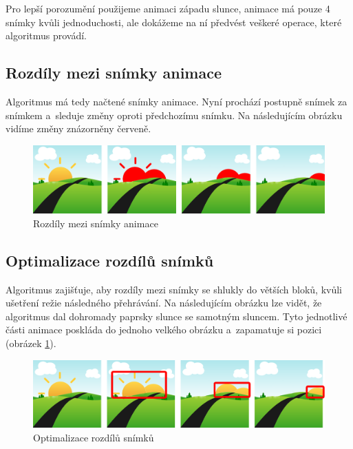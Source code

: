 Pro lepší porozumění použijeme animaci západu slunce, animace má pouze 4 snímky kvůli jednoduchosti, ale dokážeme na ní předvést veškeré operace, které algoritmus provádí.


\subsection{Rozdíly mezi snímky animace}
\label{section:algdiffsformat}

Algoritmus má tedy načtené snímky animace. Nyní prochází postupně snímek za snímkem a~sleduje změny oproti předchozímu snímku. Na následujícím obrázku vidíme změny znázorněny červeně.

\begin{figure}[h]
\centering
\includegraphics[width=1\textwidth]{figures/alg-diffs.png}
\caption{Rozdíly mezi snímky animace}
\label{fig:algdiffs}
\end{figure}


\subsection{Optimalizace rozdílů snímků}

Algoritmus zajišťuje, aby rozdíly mezi snímky se shlukly do větších bloků, kvůli ušetření režie následného přehrávání. Na následujícím obrázku lze vidět, že algoritmus dal dohromady paprsky slunce se samotným sluncem. Tyto jednotlivé části animace poskláda do jednoho velkého obrázku a~zapamatuje si pozici (obrázek \ref{fig:algdiffs}). 

\begin{figure}[h]
\centering
\includegraphics[width=1\textwidth]{figures/alg-simplify.png}
\caption{Optimalizace rozdílů snímků}
\label{fig:algsimplify}
\end{figure}
\FloatBarrier

